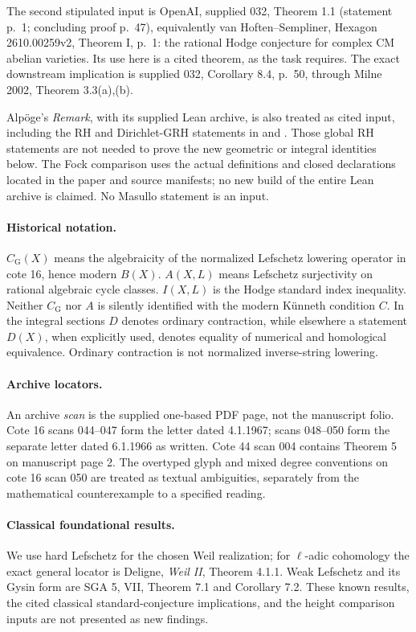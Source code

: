 \documentclass[11pt,a4paper]{article}
\theoremstyle{definition}
\theoremstyle{remark}
\begin{document}
The second stipulated input is OpenAI, supplied 032,
Theorem 1.1 (statement p.~1; concluding proof p.~47),
equivalently van Hoften--Sempliner, Hexagon 2610.00259v2,
Theorem I, p.~1: the rational Hodge conjecture for complex CM
abelian varieties. Its use here is a cited theorem, as the task
requires. The exact downstream implication is supplied 032,
Corollary 8.4, p.~50, through Milne 2002, Theorem 3.3(a),(b).

Alp\"oge's \emph{Remark}, with its supplied Lean archive, is also
treated as cited input, including the RH and Dirichlet-GRH statements
in  and .
Those global RH statements are not needed to prove the new geometric
or integral identities below. The Fock comparison uses the actual
definitions and closed declarations located in the paper and source
manifests; no new build of the entire Lean archive is claimed.
No Masullo statement is an input.

\paragraph{Historical notation.}
$C_{\mathrm G}(X)$ means the algebraicity of the normalized
Lefschetz lowering operator in cote 16, hence modern $B(X)$.
$A(X,L)$ means Lefschetz surjectivity on rational algebraic cycle
classes. $I(X,L)$ is the Hodge standard index inequality.
Neither $C_{\mathrm G}$ nor $A$ is silently identified with the
modern K\"unneth condition $C$. In the integral sections $D$
denotes ordinary contraction, while elsewhere a statement
$D(X)$, when explicitly used, denotes equality of numerical and
homological equivalence. Ordinary contraction is not normalized
inverse-string lowering.

\paragraph{Archive locators.}
An archive \emph{scan} is the supplied one-based PDF page, not the
manuscript folio. Cote 16 scans 044--047 form the letter dated
4.1.1967; scans 048--050 form the separate letter dated 6.1.1966
as written. Cote 44 scan 004 contains Theorem 5 on manuscript
page 2. The overtyped glyph and mixed degree conventions on
cote 16 scan 050 are treated as textual ambiguities, separately
from the mathematical counterexample to a specified reading.

\paragraph{Classical foundational results.}
We use hard Lefschetz for the chosen Weil realization; for
$\ell$-adic cohomology the exact general locator is Deligne,
\emph{Weil II}, Theorem 4.1.1. Weak Lefschetz and its Gysin form
are SGA 5, VII, Theorem 7.1 and Corollary 7.2. These known results,
the cited classical standard-conjecture implications, and the
height comparison inputs are not presented as new findings.
\end{document}
